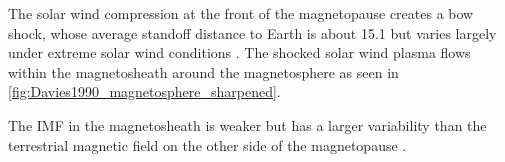 The solar wind compression at the front of the magnetopause creates a bow shock, whose average standoff distance to Earth is about \SI{15.1}{\RE} but varies largely under extreme solar wind conditions \citep{Fairfield1971}. The shocked solar wind plasma flows within the magnetosheath around the magnetosphere as seen in \autoref{fig:Davies1990_magnetosphere_sharpened}.
\begin{figure}[htb]
\end{figure}
The IMF in the magnetosheath is weaker but has a larger variability than the terrestrial magnetic field on the other side of the magnetopause \citep{DeKeyser2005}.

